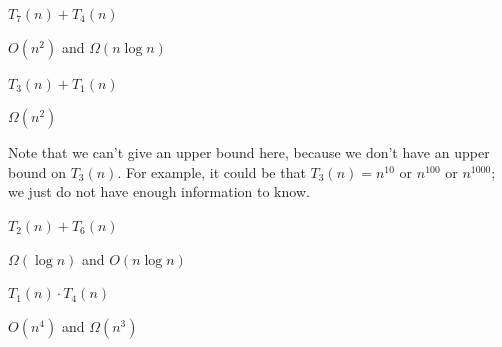 \begin{prob}
\begin{subprobset}
        \begin{subprob}
            $T_7(n) + T_4(n)$

            \begin{soln}
                $O(n^2)$ and $\Omega(n \log n)$
            \end{soln}
        \end{subprob}

        \begin{subprob}
            $T_3(n) + T_1(n)$

            \begin{soln}
                $\Omega(n^2)$

                Note that we can't give an upper bound here, because we don't have an upper
                bound on $T_3(n)$. For example, it could be that $T_3(n) = n^{10}$ or
                $n^{100}$ or $n^{1000}$; we just do not have enough information to know.
            \end{soln}
        \end{subprob}

        \begin{subprob}
            $T_2(n) + T_6(n)$

            \begin{soln}
                $\Omega(\log n)$ and $O(n \log n)$
            \end{soln}
        \end{subprob}

        \begin{subprob}
            $T_1(n) \cdot T_4(n)$

            \begin{soln}
                $O(n^4)$ and $\Omega(n^3)$

            \end{soln}

        \end{subprob}

    \end{subprobset}

\end{prob}

